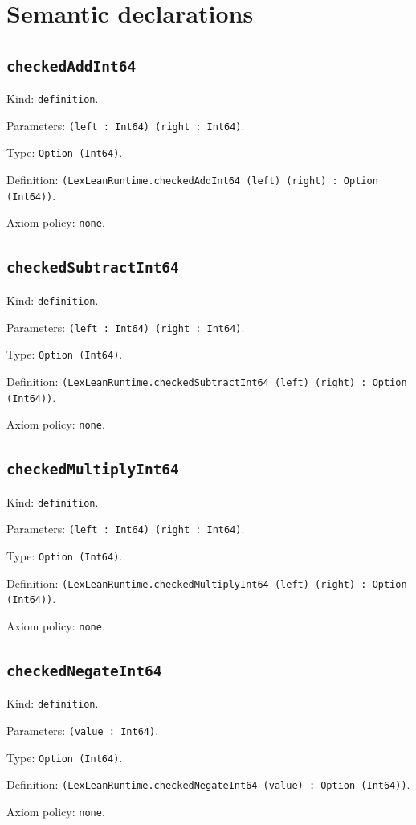 \documentclass[11pt]{article}
\begin{document}
\section*{Semantic declarations}
\subsection*{\texttt{checkedAddInt64}}
\noindent Kind: \texttt{definition}.\par
\noindent Parameters: \texttt{(left : Int64) (right : Int64)}.\par
\noindent Type: \texttt{Option (Int64)}.\par
\noindent Definition: \texttt{(LexLeanRuntime.checkedAddInt64 (left) (right) : Option (Int64))}.\par
\noindent Axiom policy: \texttt{none}.\par
\subsection*{\texttt{checkedSubtractInt64}}
\noindent Kind: \texttt{definition}.\par
\noindent Parameters: \texttt{(left : Int64) (right : Int64)}.\par
\noindent Type: \texttt{Option (Int64)}.\par
\noindent Definition: \texttt{(LexLeanRuntime.checkedSubtractInt64 (left) (right) : Option (Int64))}.\par
\noindent Axiom policy: \texttt{none}.\par
\subsection*{\texttt{checkedMultiplyInt64}}
\noindent Kind: \texttt{definition}.\par
\noindent Parameters: \texttt{(left : Int64) (right : Int64)}.\par
\noindent Type: \texttt{Option (Int64)}.\par
\noindent Definition: \texttt{(LexLeanRuntime.checkedMultiplyInt64 (left) (right) : Option (Int64))}.\par
\noindent Axiom policy: \texttt{none}.\par
\subsection*{\texttt{checkedNegateInt64}}
\noindent Kind: \texttt{definition}.\par
\noindent Parameters: \texttt{(value : Int64)}.\par
\noindent Type: \texttt{Option (Int64)}.\par
\noindent Definition: \texttt{(LexLeanRuntime.checkedNegateInt64 (value) : Option (Int64))}.\par
\noindent Axiom policy: \texttt{none}.\par
\end{document}
